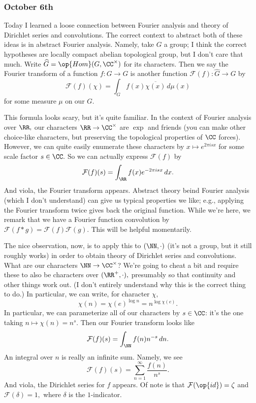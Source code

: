 \subsubsection{October 6th}
Today I learned a loose connection between Fourier analysis and theory of Dirichlet series and convolutions. The correct context to abstract both of these ideas is in abstract Fourier analysis. Namely, take $G$ a group; I think the correct hypotheses are locally compact abelian topological group, but I don't care that much. Write $\widehat G=\op{Hom}(G,\CC^\times)$ for its characters. Then we say the Fourier transform of a function $f:G\to G$ is another function $\mathcal F(f):\widehat G\to G$ by
\[\mathcal F(f)(\chi)=\int_Gf(x)\overline{\chi(x)}\,d\mu(x)\]
for some measure $\mu$ on our $G.$

This formula looks scary, but it's quite familiar. In the context of Fourier analysis over $\RR,$ our characters $\RR\to\CC^\times$ are $\exp$ and friends (you can make other choice-like characters, but preserving the topological properties of $\CC$ forces). However, we can quite easily enumerate these characters by $x\mapsto e^{2\pi isx}$ for some scale factor $s\in\CC.$ So we can actually express $\mathcal F(f)$ by
\[\mathcal F(f)(s)=\int_\RR f(x)e^{-2\pi isx}\,dx.\]
And viola, the Fourier transform appears. Abstract theory beind Fourier analysis (which I don't understand) can give us typical properties we like; e.g., applying the Fourier transform twice gives back the original function. While we're here, we remark that we have a Fourier function convolution by $\mathcal F(f*g)=\mathcal F(f)\mathcal F(g).$ This will be helpful momentarily.

The nice observation, now, is to apply this to $(\NN,\cdot)$ (it's not a group, but it still roughly works) in order to obtain theory of Dirichlet series and convolutions. What are our characters $\NN\to\CC^\times$? We're going to cheat a bit and require these to also be characters over $(\RR^+,\cdot),$ presumably so that continuity and other things work out. (I don't entirely understand why this is the correct thing to do.) In particular, we can write, for character $\chi,$
\[\chi(n)=\chi(e)^{\log n}=n^{\log\chi(e)}.\]
In particular, we can parameterize all of our characters by $s\in\CC$: it's the one taking $n\mapsto\chi(n)=n^s.$ Then our Fourier transform looks like
\[\mathcal F(f)(s)=\int_\NN f(n)n^{-s}\,dn.\]
An integral over $n$ is really an infinite sum. Namely, we see
\[\mathcal F(f)(s)=\sum_{n=1}^\infty\frac{f(n)}{n^s}.\]
And viola, the Dirichlet series for $f$ appears. Of note is that $\mathcal F(\op{id})=\zeta$ and $\mathcal F(\delta)=1,$ where $\delta$ is the $1$-indicator.

